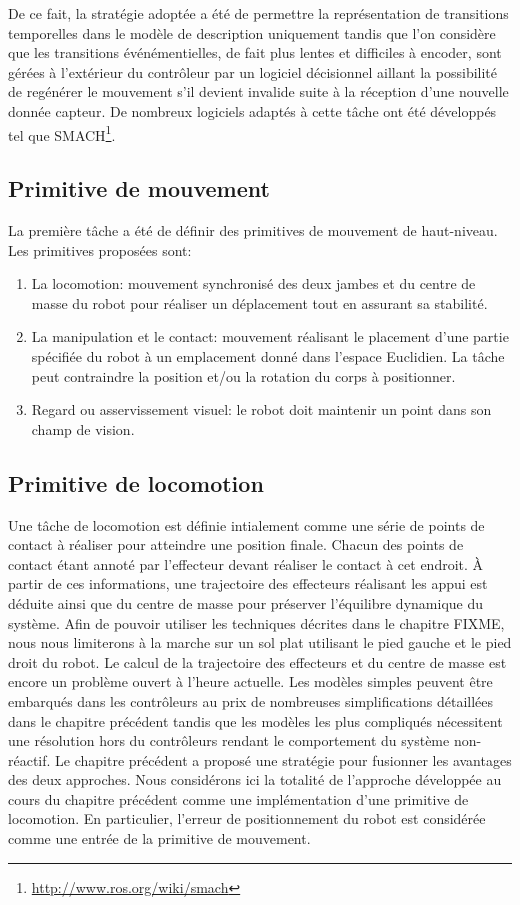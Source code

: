 De ce fait, la stratégie adoptée a été de permettre la représentation
de transitions temporelles dans le modèle de description uniquement
tandis que l'on considère que les transitions événémentielles, de fait
plus lentes et difficiles à encoder, sont gérées à l'extérieur du
contrôleur par un logiciel décisionnel aillant la possibilité de
regénérer le mouvement s'il devient invalide suite à la réception
d'une nouvelle donnée capteur. De nombreux logiciels adaptés à cette
tâche ont été développés tel que
SMACH\footnote{\url{http://www.ros.org/wiki/smach}}.


\subsection{Primitive de mouvement}

La première tâche a été de définir des primitives de mouvement de
haut-niveau. Les primitives proposées sont:
\begin{enumerate}
\item La locomotion: mouvement synchronisé des deux jambes et du
  centre de masse du robot pour réaliser un déplacement tout en
  assurant sa stabilité.
\item La manipulation et le contact: mouvement réalisant le placement
  d'une partie spécifiée du robot à un emplacement donné dans l'espace
  Euclidien. La tâche peut contraindre la position et/ou la rotation
  du corps à positionner.
\item Regard ou asservissement visuel: le robot doit maintenir un
  point dans son champ de vision.
\end{enumerate}


\subsection{Primitive de locomotion}

Une tâche de locomotion est définie intialement comme une série de
points de contact à réaliser pour atteindre une position
finale. Chacun des points de contact étant annoté par l'effecteur
devant réaliser le contact à cet endroit. À partir de ces
informations, une trajectoire des effecteurs réalisant les appui est
déduite ainsi que du centre de masse pour préserver l'équilibre
dynamique du système. Afin de pouvoir utiliser les techniques décrites
dans le chapitre FIXME, nous nous limiterons à la marche sur un sol
plat utilisant le pied gauche et le pied droit du robot. Le calcul de
la trajectoire des effecteurs et du centre de masse est encore un
problème ouvert à l'heure actuelle. Les modèles simples peuvent être
embarqués dans les contrôleurs au prix de nombreuses simplifications
détaillées dans le chapitre précédent tandis que les modèles les plus
compliqués nécessitent une résolution hors du contrôleurs rendant le
comportement du système non-réactif. Le chapitre précédent a proposé
une stratégie pour fusionner les avantages des deux approches. Nous
considérons ici la totalité de l'approche développée au cours du
chapitre précédent comme une implémentation d'une primitive de
locomotion. En particulier, l'erreur de positionnement du robot est
considérée comme une entrée de la primitive de mouvement.


